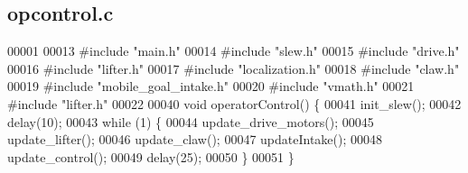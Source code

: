 \subsection{opcontrol.\+c}
\label{opcontrol_8c_source}

\begin{DoxyCode}
00001 
00013 \textcolor{preprocessor}{#include "main.h"}
00014 \textcolor{preprocessor}{#include "slew.h"}
00015 \textcolor{preprocessor}{#include "drive.h"}
00016 \textcolor{preprocessor}{#include "lifter.h"}
00017 \textcolor{preprocessor}{#include "localization.h"}
00018 \textcolor{preprocessor}{#include "claw.h"}
00019 \textcolor{preprocessor}{#include "mobile_goal_intake.h"}
00020 \textcolor{preprocessor}{#include "vmath.h"}
00021 \textcolor{preprocessor}{#include "lifter.h"}
00022 
00040 \textcolor{keywordtype}{void} operatorControl() \{
00041     init_slew();
00042     delay(10);
00043     \textcolor{keywordflow}{while} (1) \{
00044         update_drive_motors();
00045         update_lifter();
00046         update_claw();
00047         updateIntake();
00048         update_control();
00049         delay(25);
00050     \}
00051 \}
\end{DoxyCode}

